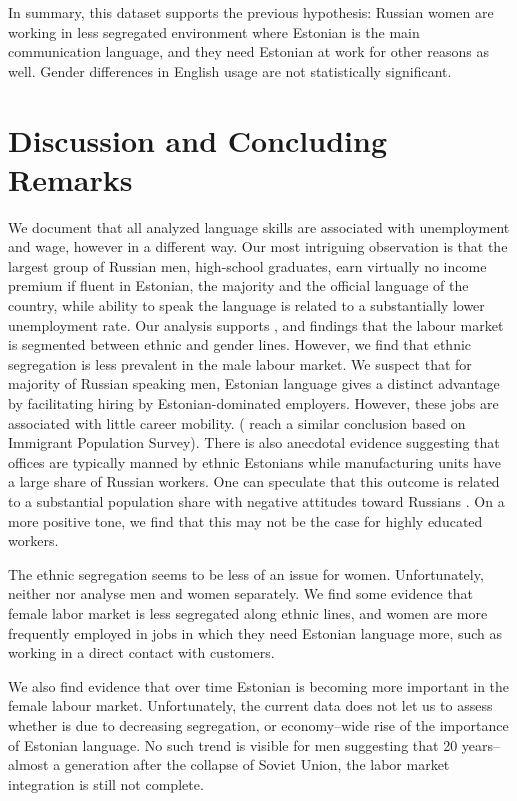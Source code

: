 \documentclass[12pt, a4paper]{article}
\begin{document}
In summary, this dataset supports the previous hypothesis: Russian women are
working in less segregated environment where Estonian is the main
communication language, and they need Estonian at work for other reasons as
well.  Gender differences in English usage are not statistically
significant.

\section{Discussion and Concluding Remarks}
\label{sec:discussion}

We document that all analyzed language skills are associated with
unemployment and wage, however in a different way. Our most
intriguing observation is that the largest group of
Russian men, high-school graduates, earn virtually no income premium if fluent in Estonian,
the majority and the official language of the country, while ability
to speak the language is related to a substantially
lower unemployment rate.
Our analysis supports \citet{YaoandOurs2015}, and \citet{Lindemann2013} findings that
the labour market is segmented between ethnic and gender lines.
However, we find that ethnic segregation is less prevalent in the male
labour market.
We suspect that for majority of Russian speaking men, Estonian
language gives a distinct advantage by facilitating hiring by
Estonian-dominated employers.  However, these
jobs are associated with little career mobility.
(\citet{leppik+vihalemm2015JofBaltStud} reach a similar conclusion
based on Immigrant Population Survey).  There is also
anecdotal evidence suggesting that offices are
typically manned by ethnic Estonians while manufacturing units have a
large share of Russian workers.
One can speculate that this outcome is related to a substantial population share
with negative attitudes toward Russians \citep{korts2009JofBaltStud}.
On a more positive tone, we find
that this may not be the case for highly educated workers.

The ethnic segregation seems to be less of an issue for women.
Unfortunately, neither \citet{Toomet2011} nor
\citet{leppik+vihalemm2015JofBaltStud} analyse men and women
separately.  We find some evidence that female labor market is less
segregated along ethnic lines, and women are more frequently employed in jobs in which they need Estonian
language more, such as working in a direct contact with customers.

We also find evidence that over time Estonian is becoming more
important in the female labour market.  Unfortunately, the current data
does not let us to assess whether is due to decreasing segregation, or
economy--wide rise of the importance of Estonian language.  No such trend is visible for
men suggesting that 20 years--almost a generation after the collapse of Soviet Union, the
labor market integration is still not complete.
\end{document}
